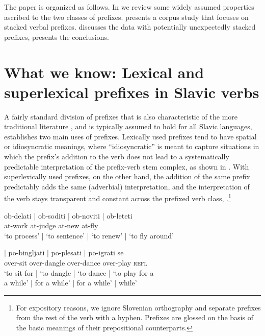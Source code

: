 \documentclass[output=paper,colorlinks,citecolor=brown]{langscibook}
\begin{document}
The paper is organized as follows. In  we review some widely assumed properties ascribed to the two classes of prefixes.  presents a corpus study that focuses on stacked verbal prefixes.  discusses the data with potentially unexpectedly stacked prefixes,  presents the conclusions. 


\section{What we know: Lexical and superlexical prefixes in Slavic verbs}\label{sec:whatWeKnow}

A fairly standard division of prefixes that is also characteristic of the more traditional literature \citep[e.g.][]{Muha1993,mar+:toporisic2000}, and is typically assumed to hold for all Slavic languages, establishes two main uses of prefixes. Lexically used prefixes tend to have spatial or idiosyncratic meanings, where ``idiosyncratic'' is meant to capture situations in which the prefix's addition to the verb does not lead to a systematically predictable interpretation of the prefix-verb stem complex, as shown in . With superlexically used prefixes, on the other hand, the addition of the same prefix predictably adds the same (adverbial) interpretation, and the interpretation of the verb stays transparent and constant across the prefixed verb class, .\footnote{For expository reasons, we ignore Slovenian orthography and separate prefixes from the rest of the verb with a hyphen. Prefixes are glossed on the basis of the basic meanings of their prepositional counterparts.}


\ea 
\glll ob-delati | ob-soditi | ob-noviti | ob-leteti\\
{at}-work {} {at}-judge {} {at}-new {} {at}-fly \\
{`to process'} | {`to sentence'} | {`to renew'} | {`to fly around'} \label{ex:InternalPrefixes} \\
\z

\ea
{} | {po-bingljati} | {po-plesati} | {po-igrati se}\\
{{over}-sit} {} {{over}-dangle} {} {{over}-dance} {} {{over}-play  \textsc{refl}} \\
{`to sit for} | {`to dangle } |  {`to dance} | {`to play for a}\\
{\phantom{'}a while'} | {\phantom{'}for a while'} |  {\phantom{'}for a while'} | {\phantom{'}while'}\\
\label{ex:ExternalPrefixes1}
\z
\end{document}
